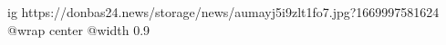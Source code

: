  
 
 
 
 

\ifcmt
  ig https://donbas24.news/storage/news/aumayj5i9zlt1fo7.jpg?1669997581624
  @wrap center
  @width 0.9
\fi
